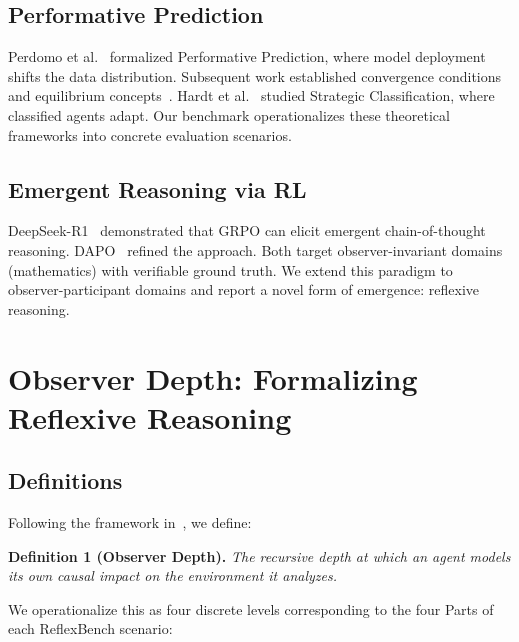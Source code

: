 \documentclass{article}
\begin{document}
\subsection{Performative Prediction}
Perdomo et al.~\citep{perdomo2020} formalized Performative Prediction, where model deployment shifts the data distribution. Subsequent work established convergence conditions and equilibrium concepts~\citep{mendler2020}. Hardt et al.~\citep{hardt2016} studied Strategic Classification, where classified agents adapt. Our benchmark operationalizes these theoretical frameworks into concrete evaluation scenarios.

\subsection{Emergent Reasoning via RL}
DeepSeek-R1~\citep{guo2025} demonstrated that GRPO can elicit emergent chain-of-thought reasoning. DAPO~\citep{yu2025} refined the approach. Both target observer-invariant domains (mathematics) with verifiable ground truth. We extend this paradigm to observer-participant domains and report a novel form of emergence: reflexive reasoning.

\section{Observer Depth: Formalizing Reflexive Reasoning}
\label{sec:od}

\subsection{Definitions}

Following the framework in~\citep{anon2026}, we define:

\vspace{0.3em}
\noindent\textbf{Definition 1 (Observer Depth).} \textit{The recursive depth at which an agent models its own causal impact on the environment it analyzes.}
\vspace{0.3em}

We operationalize this as four discrete levels corresponding to the four Parts of each ReflexBench scenario:
\end{document}

